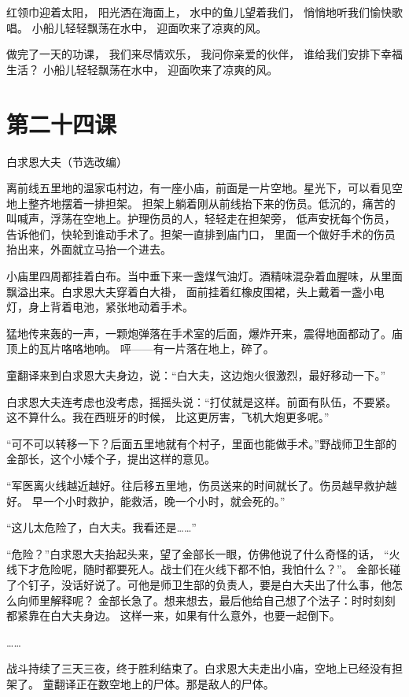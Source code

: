 \documentclass[12pt,UTF8]{ctexbook}
\begin{document}
红领巾迎着太阳，
阳光洒在海面上，
水中的鱼儿望着我们，
悄悄地听我们愉快歌唱。
小船儿轻轻飘荡在水中，
迎面吹来了凉爽的风。

做完了一天的功课，
我们来尽情欢乐，
我问你亲爱的伙伴，
谁给我们安排下幸福生活？
小船儿轻轻飘荡在水中，
迎面吹来了凉爽的风。

\section{第二十四课}

白求恩大夫（节选改编）

离前线五里地的温家屯村边，有一座小庙，前面是一片空地。星光下，可以看见空地上整齐地摆着一排担架。
担架上躺着刚从前线抬下来的伤员。低沉的，痛苦的叫喊声，浮荡在空地上。护理伤员的人，轻轻走在担架旁，
低声安抚每个伤员，告诉他们，快轮到谁动手术了。担架一直排到庙门口，
里面一个做好手术的伤员抬出来，外面就立马抬一个进去。

小庙里四周都挂着白布。当中垂下来一盏煤气油灯。酒精味混杂着血腥味，从里面飘溢出来。白求恩大夫穿着白大褂，
面前挂着红橡皮围裙，头上戴着一盏小电灯，身上背着电池，紧张地动着手术。

猛地传来轰的一声，一颗炮弹落在手术室的后面，爆炸开来，震得地面都动了。庙顶上的瓦片咯咯地响。
呯——有一片落在地上，碎了。

童翻译来到白求恩大夫身边，说：“白大夫，这边炮火很激烈，最好移动一下。”

白求恩大夫连考虑也没考虑，摇摇头说：“打仗就是这样。前面有队伍，不要紧。这不算什么。我在西班牙的时候，
比这更厉害，飞机大炮更多呢。”

“可不可以转移一下？后面五里地就有个村子，里面也能做手术。”野战师卫生部的金部长，这个小矮个子，提出这样的意见。

“军医离火线越近越好。往后移五里地，伤员送来的时间就长了。伤员越早救护越好。
早一个小时救护，能救活，晚一个小时，就会死的。”

“这儿太危险了，白大夫。我看还是……”

“危险？”白求恩大夫抬起头来，望了金部长一眼，仿佛他说了什么奇怪的话，
“火线下才危险呢，随时都要死人。战士们在火线下都不怕，我怕什么？”。
金部长碰了个钉子，没话好说了。可他是师卫生部的负责人，要是白大夫出了什么事，他怎么向师里解释呢？
金部长急了。想来想去，最后他给自己想了个法子：时时刻刻都紧靠在白大夫身边。
这样一来，如果有什么意外，也要一起倒下。

……

战斗持续了三天三夜，终于胜利结束了。白求恩大夫走出小庙，空地上已经没有担架了。
童翻译正在数空地上的尸体。那是敌人的尸体。
\end{document}
